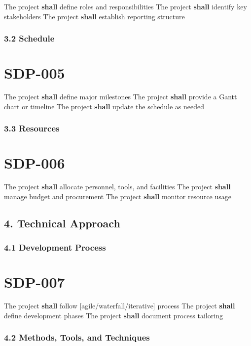 The project \textbf{shall} define roles and responsibilities
The project \textbf{shall} identify key stakeholders
The project \textbf{shall} establish reporting structure

\subsubsection{3.2 Schedule}

\section{SDP-005}\label{SDP-005}

The project \textbf{shall} define major milestones
The project \textbf{shall} provide a Gantt chart or timeline
The project \textbf{shall} update the schedule as needed

\subsubsection{3.3 Resources}

\section{SDP-006}\label{SDP-006}

The project \textbf{shall} allocate personnel, tools, and facilities
The project \textbf{shall} manage budget and procurement
The project \textbf{shall} monitor resource usage

\subsection{4. Technical Approach}

\subsubsection{4.1 Development Process}

\section{SDP-007}\label{SDP-007}

The project \textbf{shall} follow [agile/waterfall/iterative] process
The project \textbf{shall} define development phases
The project \textbf{shall} document process tailoring

\subsubsection{4.2 Methods, Tools, and Techniques}

